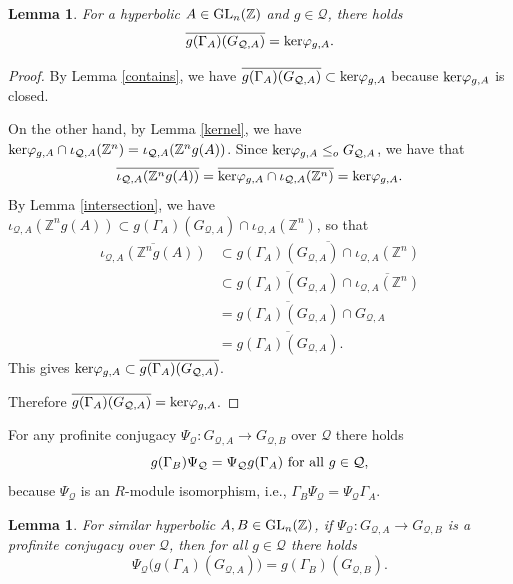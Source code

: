 \documentclass{amsart}
\theoremstyle{plain}
\newtheorem{lemma}[theorem]{Lemma}
\theoremstyle{definition}
\theoremstyle{remark}
\begin{document}
\begin{lemma}\label{open} For a hyperbolic $A\in {\rm GL}_n({\mathbb Z})$ and $g\in{\mathcal Q}$, there holds
\[ \overline{ g(\Gamma_A)(G_{ {\mathcal Q},A}) } = {\rm ker}\varphi_{g,A}.\]
\end{lemma}

\begin{proof} By Lemma \ref{contains}, we have $\overline{ g(\Gamma_A)(G_{ {\mathcal Q},A}) } \subset {\rm ker}\varphi_{g,A}$ because ${\rm ker}\varphi_{g,A}$ is closed.

On the other hand, by Lemma \ref{kernel}, we have ${\rm ker}\varphi_{g,A} \cap \iota_{ {\mathcal Q},A}({\mathbb Z}^n) = \iota_{ {\mathcal Q},A}( {\mathbb Z}^n g(A))$. Since ${\rm ker}\varphi_{g,A} \leq_o G_{ {\mathcal Q},A}$, we have that
\[ \overline{\iota_{ {\mathcal Q},A}({\mathbb Z}^n g(A))} = \overline{ {\rm ker}\varphi_{g,A}\cap \iota_{ {\mathcal Q},A}({\mathbb Z}^n)}= {\rm ker}\varphi_{g,A}.\]
By Lemma \ref{intersection}, we have $\iota_{ {\mathcal Q},A}({\mathbb Z}^n g(A)) \subset g(\Gamma_A)(G_{ {\mathcal Q},A})\cap \iota_{ {\mathcal Q},A}({\mathbb Z}^n)$, so that
\begin{align*} \overline{\iota_{ {\mathcal Q},A}({\mathbb Z}^n g(A) )} 
& \subset \overline{ g(\Gamma_A)(G_{ {\mathcal Q},A}) \cap \iota_{ {\mathcal Q},A}({\mathbb Z}^n) } \\
& \subset \overline{ g(\Gamma_A)(G_{ {\mathcal Q},A}) } \cap \overline{\iota_{ {\mathcal Q},A}({\mathbb Z}^n)} \\
& = \overline{ g(\Gamma_A)(G_{ {\mathcal Q},A}) } \cap G_{ {\mathcal Q},A} \\
& = \overline{ g(\Gamma_A)(G_{ {\mathcal Q},A})}.
\end{align*}
This gives ${\rm ker}\varphi_{g,A} \subset \overline{ g(\Gamma_A)(G_{ {\mathcal Q},A})}$.

Therefore $\overline{ g(\Gamma_A)(G_{ {\mathcal Q},A})} = {\rm ker}\varphi_{g,A}$.
\end{proof}

For any profinite conjugacy $\Psi_{\mathcal Q}:G_{ {\mathcal Q},A}\to G_{ {\mathcal Q},B}$ over ${\mathcal Q}$ there holds 
\[  g(\Gamma_B)\Psi_{\mathcal Q} =   \Psi_{\mathcal Q}g(\Gamma_A) {\rm\ for\ all\ }g\in{\mathcal Q},\]
because $\Psi_{\mathcal Q}$ is an $R$-module isomorphism, i.e., $ \Gamma_B\Psi_{\mathcal Q} =  \Psi_{\mathcal Q}\Gamma_A $.

\begin{lemma}\label{congkpower} For similar hyperbolic $A,B\in {\rm GL}_n({\mathbb Z})$, if $\Psi_{\mathcal Q}:G_{{\mathcal Q},A}\to G_{ {\mathcal Q},B}$ is a profinite conjugacy over ${\mathcal Q}$, then for all $g\in{\mathcal Q}$ there holds
\[  \Psi_{\mathcal Q}\big( g(\Gamma_A)(G_{ {\mathcal Q},A})  \big) = g(\Gamma_B)(G_{ {\mathcal Q},B}) .\]
\end{lemma}
\end{document}
